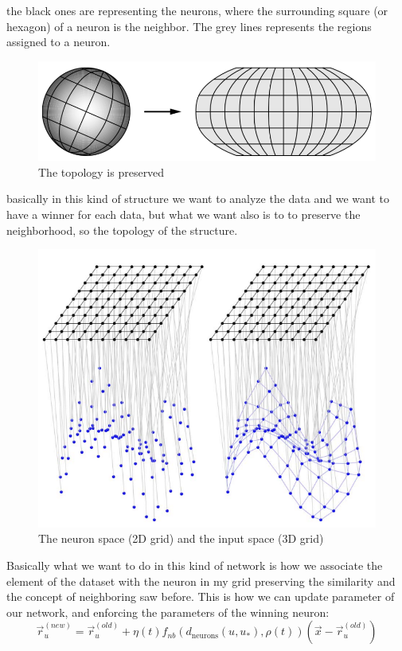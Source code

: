 \documentclass{article}
\begin{document}
the black ones are representing the neurons, where the surrounding square (or hexagon)
of a neuron is the neighbor. The grey lines represents the regions assigned to a neuron.
\begin{figure}[H]
    \centering
    \includegraphics[scale=0.5]{images/topology_sop.png}
    \caption{The topology is preserved}
\end{figure}
basically in this kind of structure we want to analyze the data and we want to have a winner
for each data, but what we want also is to to preserve the neighborhood, so the topology
of the structure.
\begin{figure}[H]
    \centering
    \includegraphics[scale=0.5]{images/neigh_asoc_topo.png}
    \caption{The neuron space (2D grid) and the input space (3D grid)}
\end{figure}
Basically what we want to do in this kind of network is how we associate the element of the dataset with the neuron
in my grid preserving the similarity and the concept of neighboring saw before. This is how we can update
parameter of our network, and enforcing the parameters of the winning neuron:
$$\vec{r}_u^{(new)} = \vec{r}_u^{(old)} + \eta(t) f_{nb} (d_{\text{neurons}} (u,u_*), \rho (t)) (\vec{x}-\vec{r}_u^{(old)})$$
\end{document}
